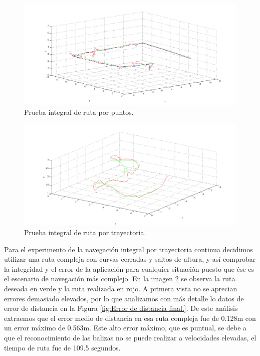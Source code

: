 \begin{figure}[H]
	\begin{center}
		\includegraphics[width=1\textwidth]{imag/IMG42.png}
				\caption{Prueba integral de ruta por puntos.}
		\label{fig:Prueba integral de ruta por puntos.}	
	\end{center}
\end{figure}

\begin{figure}[H]
	\begin{center}
		\includegraphics[width=1\textwidth]{imag/IMG43.png}
				\caption{Prueba integral de ruta por trayectoria.}
		\label{fig:Prueba integral de ruta por trayectoria.}	
	\end{center}
\end{figure}

\hspace{1cm} Para el experimento de la navegación integral por trayectoria continua decidimos utilizar una ruta compleja con curvas cerradas y saltos de altura, y así comprobar la integridad y el error de la aplicación para cualquier situación puesto que ése es el escenario de navegación más complejo. En la imagen \ref{fig:Prueba integral de ruta por trayectoria.} se observa la ruta deseada en verde y la ruta realizada en rojo. A primera vista no se aprecian errores demasiado elevados, por lo que analizamos con más detalle lo datos de error de distancia en la Figura \ref{fig:Error de distancia final.}. De este análisis extraemos que el error medio de distancia en esa ruta compleja fue de 0.128m con un error máximo de 0.563m. Este alto error máximo, que es puntual, se debe a que el reconocimiento de las balizas no se puede realizar a velocidades elevadas, el tiempo de ruta fue de 109.5 segundos.

